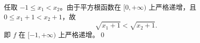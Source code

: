任取 $-1\le x_1<x_2$。由于平方根函数在 $[0,+\infty)$ 上严格递增，且 $0\le x_1+1<x_2+1$，故
\[
\sqrt{x_1+1}<\sqrt{x_2+1}.
\]
即 $f$ 在 $[-1,+\infty)$ 上严格递增。\qed
